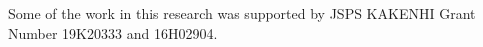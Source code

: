 \documentclass[a4paper]{report}
\begin{document}
Some of the work in this research was supported by JSPS KAKENHI Grant Number 19K20333 and 16H02904.

\newpage
{}
\renewcommand{\bibname}{References}

%
%


\end{document}
